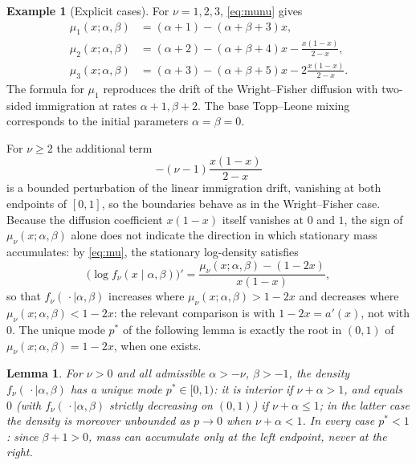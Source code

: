 \documentclass[11pt,reqno]{amsart}
\newtheorem{lemma}[theorem]{Lemma}
\theoremstyle{definition}
\newtheorem{example}[theorem]{Example}
\theoremstyle{remark}
\numberwithin{equation}{section}
\begin{document}
\begin{example}[Explicit cases]
For \(\nu=1,2,3\), \eqref{eq:munu} gives
\begin{align*}
\mu_1(x;\alpha,\beta)&=(\alpha+1)-(\alpha+\beta+3)x,\\
\mu_2(x;\alpha,\beta)&=(\alpha+2)-(\alpha+\beta+4)x-\frac{x(1-x)}{2-x},\\
\mu_3(x;\alpha,\beta)&=(\alpha+3)-(\alpha+\beta+5)x-2\frac{x(1-x)}{2-x}.
\end{align*}
The formula for \(\mu_1\) reproduces the drift of the Wright--Fisher diffusion with two-sided immigration at rates \(\alpha+1,\beta+2\). The base Topp--Leone mixing corresponds to the initial parameters \(\alpha=\beta=0\).

For \(\nu\ge2\) the additional term
\[
-(\nu-1)\frac{x(1-x)}{2-x}
\]
is a bounded perturbation of the linear immigration drift, vanishing at both endpoints of \([0,1]\), so the boundaries behave as in the Wright--Fisher case. Because the diffusion coefficient \(x(1-x)\) itself vanishes at \(0\) and \(1\), the sign of \(\mu_\nu(x;\alpha,\beta)\) alone does not indicate the direction in which stationary mass accumulates: by \eqref{eq:mu}, the stationary log-density satisfies
\[
\bigl(\log f_\nu(x\mid\alpha,\beta)\bigr)'=\frac{\mu_\nu(x;\alpha,\beta)-(1-2x)}{x(1-x)},
\]
so that \(f_\nu(\,\cdot\mid\alpha,\beta)\) increases where \(\mu_\nu(x;\alpha,\beta)>1-2x\) and decreases where \(\mu_\nu(x;\alpha,\beta)<1-2x\): the relevant comparison is with \(1-2x=a'(x)\), not with \(0\). The unique mode \(p^*\) of the following lemma is exactly the root in \((0,1)\) of \(\mu_\nu(x;\alpha,\beta)=1-2x\), when one exists.
\end{example}

\begin{lemma}
For \(\nu>0\) and all admissible \(\alpha>-\nu\), \(\beta>-1\), the density \(f_\nu(\,\cdot\mid\alpha,\beta)\) has a unique mode \(p^*\in[0,1)\): it is interior if \(\nu+\alpha>1\), and equals \(0\) (with \(f_\nu(\,\cdot\mid\alpha,\beta)\) strictly decreasing on \((0,1)\)) if \(\nu+\alpha\le1\); in the latter case the density is moreover unbounded as \(p\to0\) when \(\nu+\alpha<1\). In every case \(p^*<1\): since \(\beta+1>0\), mass can accumulate only at the left endpoint, never at the right.
\end{lemma}
\end{document}
